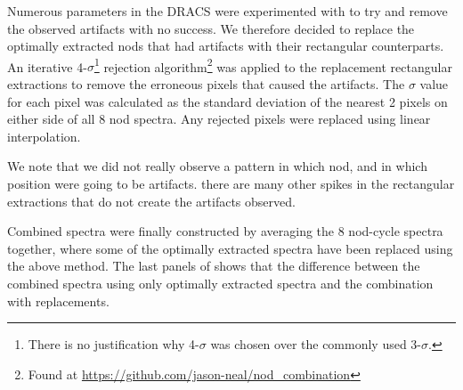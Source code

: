 Numerous parameters in the DRACS were experimented with to try and remove the observed artifacts with no success. We therefore decided to replace the optimally extracted nods that had artifacts with their rectangular counterparts. 
An iterative 4-\(\sigma \)\footnote{There is no justification why 4-\(\sigma\) was chosen over the commonly used 3-\(\sigma\).} rejection algorithm\footnote{Found at \url{https://github.com/jason-neal/nod_combination}} was applied to the replacement rectangular extractions to remove the erroneous pixels that caused the artifacts. The \(\sigma\) value for each pixel was calculated as the standard deviation of the nearest 2 pixels on either side of all 8 nod spectra. Any rejected pixels were replaced using linear interpolation.

We note that we did not really observe a pattern in which nod, and in which position were going to be artifacts. there are many other spikes in the rectangular extractions that do not create the artifacts observed. 

Combined spectra were finally constructed by averaging the 8 nod-cycle spectra together, where some of the optimally extracted spectra have been replaced using the above method. The last panels of  shows that the difference between the combined spectra using only optimally extracted spectra and the combination with replacements.

